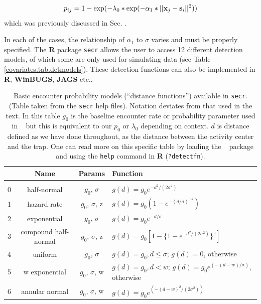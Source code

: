 \[
p_{ij} = 1-\exp(-\lambda_{0}* \exp(-\alpha_{1} *||{\bf x}_{j}-{\bf
  s}_{i}||^{2}) )
\]
which was previously discussed in Sec. \label{scr0.sec.binomial}.


In each of the cases, the relationship of $\alpha_1$ to $\sigma$ varies and must
be properly specified.  The {\bf R} package
{\tt secr} allows the user to access 12 different detection models, of which
some are only used for simulating data (see Table \ref{covariates.tab.detmodels}). These detection
functions can also be implemented in {\bf R}, {\bf WinBUGS},
{\bf JAGS} etc..


\begin{table}[ht]
\centering
\caption{
  Basic encounter probability models (``distance functions'')
 available in \mbox{\tt secr}.  (Table taken from
  the 
\mbox{\tt secr}
  help files). Notation deviates from that used in the text.
  In this table $g_{0}$ is the baseline encounter rate or probability
  parameter used in \secr~ but this is equivalent to our $p_{0}$ or
  $\lambda_{0}$ depending on context. $d$ is distance defined as we have done throughout,
  as the distance between the activity center and the trap.
  One can read more on this specific table by loading the \secr~ package and using the
  {\tt help} command in {\bf R} ({\tt ?detectfn}).
}
\begin{tabular}{cccl}
\hline \hline
 & Name & Params & Function  \\ \hline
 \\
0 & half-normal &$g_0$, $\sigma$          &  $g(d) = g_0 e^{-d^2 / (2  \sigma^2)}$  \\
1 &hazard rate  & $g_0$, $\sigma$, z      &  $g(d) = g_0 (1 - e^{-(d / \sigma) ^{-z} })$ \\
2 &exponential   &$g_0$, $\sigma$    &  $g(d) = g_0 e^{- d / \sigma}$ \\
3 &compound half-normal  & $g_0$, $\sigma$, z & $g(d) = g_0 [1 - \{1 - e^{-d^2 /(2 \sigma^2)}\}^z]$ \\
4 &uniform     & $g_0$, $\sigma$     &
\parbox[t]{2in}{ $g(d) = g_{0}, d \leq \sigma$; \\
                 $g(d)= 0$, otherwise
} \\
5 &w exponential            & $g_0$, $\sigma$, w &
\parbox[t]{2in}{ $g(d) = g_{0}, d < w$; \\
                 $g(d) = g_{0} e^{(- (d - w) / \sigma)}$, otherwise
} \\
6 &annular normal           & $g_0$, $\sigma$, w & $g(d) = g_0 e^{(-(d-w)^2 / (2 \sigma^2))}$ \\

\end{tabular}
\end{table}
